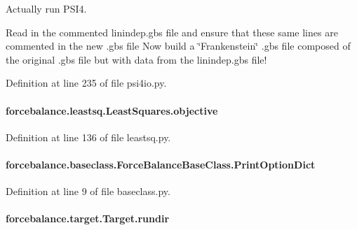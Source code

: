 Actually run P\-S\-I4. 

Read in the commented linindep.\-gbs file and ensure that these same lines are commented in the new .gbs file Now build a \char`\"{}\-Frankenstein\char`\"{} .gbs file composed of the original .gbs file but with data from the linindep.\-gbs file! 

Definition at line 235 of file psi4io.\-py.

\hypertarget{classforcebalance_1_1leastsq_1_1LeastSquares_a169fd8ca94e8f36539ec4ccfa0af4902}{
\paragraph[{objective}]{\setlength{\rightskip}{0pt plus 5cm}forcebalance.\-leastsq.\-Least\-Squares.\-objective\hspace{0.3cm}{\ttfamily [inherited]}}}\label{classforcebalance_1_1leastsq_1_1LeastSquares_a169fd8ca94e8f36539ec4ccfa0af4902}


Definition at line 136 of file leastsq.\-py.

\hypertarget{classforcebalance_1_1baseclass_1_1ForceBalanceBaseClass_a5c55e661e746d1a4443f4e0bc34ebe05}{
\paragraph[{Print\-Option\-Dict}]{\setlength{\rightskip}{0pt plus 5cm}forcebalance.\-baseclass.\-Force\-Balance\-Base\-Class.\-Print\-Option\-Dict\hspace{0.3cm}{\ttfamily [inherited]}}}\label{classforcebalance_1_1baseclass_1_1ForceBalanceBaseClass_a5c55e661e746d1a4443f4e0bc34ebe05}


Definition at line 9 of file baseclass.\-py.

\hypertarget{classforcebalance_1_1target_1_1Target_a6872de5b2d4273b82336ea5b0da29c9e}{
\paragraph[{rundir}]{\setlength{\rightskip}{0pt plus 5cm}forcebalance.\-target.\-Target.\-rundir\hspace{0.3cm}{\ttfamily [inherited]}}}\label{classforcebalance_1_1target_1_1Target_a6872de5b2d4273b82336ea5b0da29c9e}


